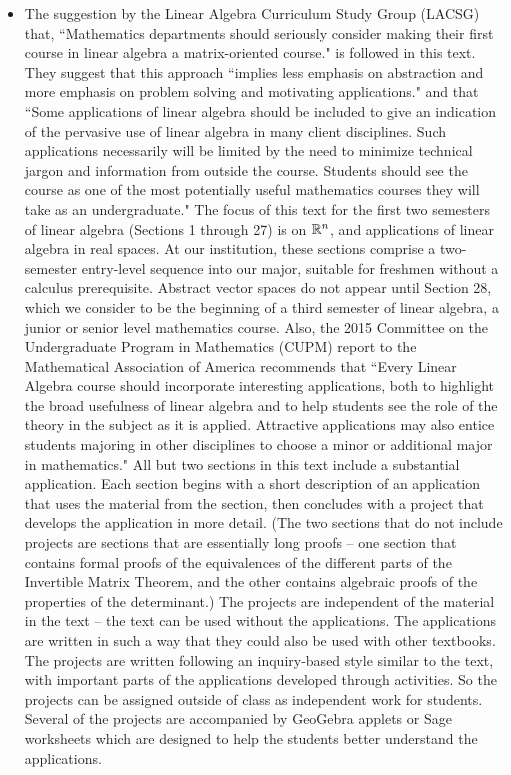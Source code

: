 \begin{itemize}
\item The suggestion by the Linear Algebra Curriculum Study Group (LACSG) that, ``Mathematics departments should seriously consider making their first course in linear algebra a matrix-oriented course." is followed in this text. They suggest that this approach ``implies less emphasis on abstraction and more emphasis on problem solving and motivating applications." and that ``Some applications of linear algebra should be included to give an indication of the pervasive use of linear algebra in many client disciplines. Such applications necessarily will be limited by the need to minimize technical jargon and information from outside the course. Students should see the course as one of the most potentially useful mathematics courses they will take as an undergraduate." The focus of this text for the first two semesters of linear algebra (Sections 1 through 27) is on $\mathbb{R}^n$, and applications of linear algebra in real spaces. At our institution, these sections comprise a two-semester entry-level sequence into our major, suitable for freshmen without a calculus prerequisite. Abstract vector spaces do not appear until Section 28, which we consider to be the beginning of a third semester of linear algebra, a junior or senior level mathematics course. Also, the 2015 Committee on the Undergraduate Program in Mathematics (CUPM) report to the Mathematical Association of America recommends that ``Every Linear Algebra course should incorporate interesting applications, both to highlight the broad usefulness of linear algebra and to help students see the role of the theory in the subject as it is applied.  Attractive applications may also entice students majoring in other disciplines to choose a minor or additional major in mathematics." All but two sections in this text include a substantial application. Each section begins with a short description of an application that uses the material from the section, then concludes with a project that develops the application in more detail. (The two sections that do not include projects are sections that are essentially long proofs -- one section that contains formal proofs of the equivalences of the different parts of the Invertible Matrix Theorem, and the other contains algebraic proofs of the properties of the determinant.) The projects are independent of the material in the text -- the text can be used without the applications. The applications are written in such a way that they could also be used with other textbooks. The projects are written following an inquiry-based style similar to the text, with important parts of the applications developed through activities. So the projects can be assigned outside of class as independent work for students. Several of the projects are accompanied by GeoGebra applets or Sage worksheets which are designed to help the students better understand the applications. 

\end{itemize}
